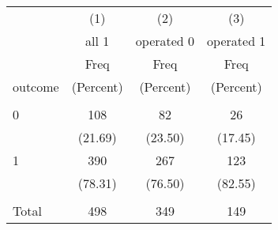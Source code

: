 \begin{tabular}{lccc} \hline
 & (1) & (2) & (3) \\
 & all 1 & operated 0 & operated 1 \\
 & Freq & Freq & Freq \\
outcome & (Percent) & (Percent) & (Percent) \\ \hline
 &  &  &  \\
0 & 108 & 82 & 26 \\
 & (21.69) & (23.50) & (17.45) \\
1 & 390 & 267 & 123 \\
 & (78.31) & (76.50) & (82.55) \\
 &  &  &  \\
 Total & 498 & 349 & 149 \\ \hline
\end{tabular}
